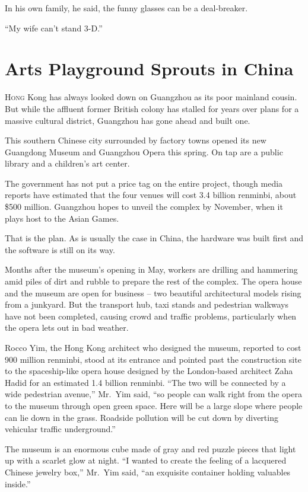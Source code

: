 ﻿\documentclass[12pt]{article}
\begin{document}
In his own family, he said, the funny glasses can be a deal-breaker.

``My wife can't stand 3-D.''

\section{Arts Playground Sprouts in China}

\lettrine{H}{ong} Kong has always looked down on Guangzhou as its poor
mainland cousin. But while the affluent former British colony has stalled for years over plans for a
massive cultural district, Guangzhou has gone ahead and built one.

This southern Chinese city surrounded by factory towns opened its new Guangdong Museum and Guangzhou
Opera this spring. On tap are a public library and a children's art center.

The government has not put a price tag on the entire project, though media reports have estimated
that the four venues will cost 3.4 billion renminbi, about \$500 million. Guangzhou hopes to unveil
the complex by November, when it plays host to the Asian Games.

That is the plan. As is usually the case in China, the hardware was built first and the software is
still on its way.

Months after the museum's opening in May, workers are drilling and hammering amid piles of dirt and
rubble to prepare the rest of the complex. The opera house and the museum are open for business --
two beautiful architectural models rising from a junkyard. But the transport hub, taxi stands and
pedestrian walkways have not been completed, causing crowd and traffic problems, particularly when
the opera lets out in bad weather.

Rocco Yim, the Hong Kong architect who designed the museum, reported to cost 900 million renminbi,
stood at its entrance and pointed past the construction site to the spaceship-like opera house
designed by the London-based architect Zaha Hadid for an estimated 1.4 billion renminbi. ``The two
will be connected by a wide pedestrian avenue,'' Mr.~Yim said, ``so people can walk right from the
opera to the museum through open green space. Here will be a large slope where people can lie down
in the grass. Roadside pollution will be cut down by diverting vehicular traffic underground.''

The museum is an enormous cube made of gray and red puzzle pieces that light up with a scarlet glow
at night. ``I wanted to create the feeling of a lacquered Chinese jewelry box,'' Mr.~Yim said, ``an
exquisite container holding valuables inside.''
\end{document}
